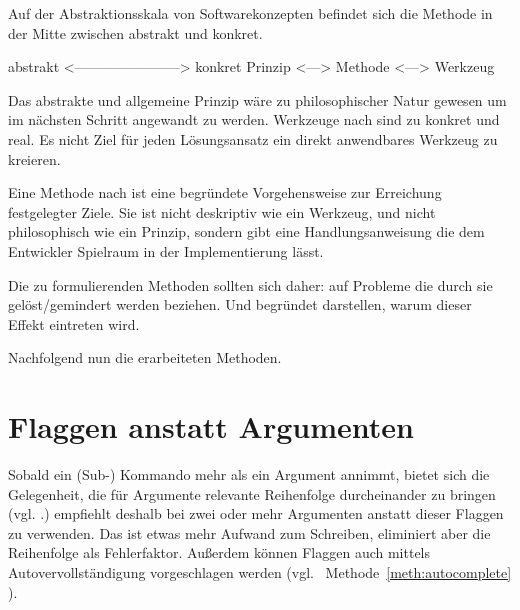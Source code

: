 \documentclass[oneside,bibliography=totocnumbered,BCOR=5mm]{scrbook}
\newenvironment{code}{\captionsetup{type=listing, skip=0pt}}{}
\begin{document}
Auf der Abstraktionsskala von Softwarekonzepten befindet sich die Methode in der
Mitte zwischen abstrakt und konkret.

\begin{code}
  \begin{shellcode}
abstrakt <-----------------------> konkret
   Prinzip <---> Methode <---> Werkzeug
  \end{shellcode}
  \medskip
\end{code}

Das abstrakte und allgemeine Prinzip \parencite{Balzert_2009} wäre zu
philosophischer Natur gewesen um im nächsten Schritt angewandt zu werden.
Werkzeuge nach \textcite{Balzert_2009} sind zu konkret und real. Es nicht Ziel
für jeden Lösungsansatz ein direkt anwendbares Werkzeug zu kreieren.

Eine Methode nach \textcite{Balzert_2009} ist eine begründete Vorgehensweise zur
Erreichung festgelegter Ziele. Sie ist nicht deskriptiv wie ein Werkzeug, und
nicht philosophisch wie ein Prinzip, sondern gibt eine Handlungsanweisung die
dem Entwickler Spielraum in der Implementierung lässt.

Die zu formulierenden Methoden sollten sich daher: auf Probleme die durch sie
gelöst/gemindert werden beziehen. Und begründet darstellen, warum dieser Effekt
eintreten wird.

Nachfolgend nun die erarbeiteten Methoden.


\newcommand{\methbox}[2]{
  \medskip
  \medskip
  \fbox{\parbox{\linewidth}{
    \refstepcounter{meth}
    \textbf{Methode~\themeth}: #2
    \label{meth:#1}
  }}
  \medskip
}
\newcommand{\methref}[1]{
  Methode~\ref{meth:#1}
}

\section{Flaggen anstatt Argumenten}

Sobald ein (Sub-) Kommando mehr als ein Argument annimmt, bietet sich die
Gelegenheit, die für Argumente relevante Reihenfolge durcheinander zu bringen
(vgl. .) \textcite{12factor} empfiehlt deshalb bei
zwei oder mehr Argumenten anstatt dieser Flaggen zu verwenden. Das ist etwas
mehr Aufwand zum Schreiben, eliminiert aber die Reihenfolge als Fehlerfaktor.
Außerdem können Flaggen auch mittels Autovervollständigung vorgeschlagen werden
(vgl.~\methref{autocomplete}).
\end{document}
